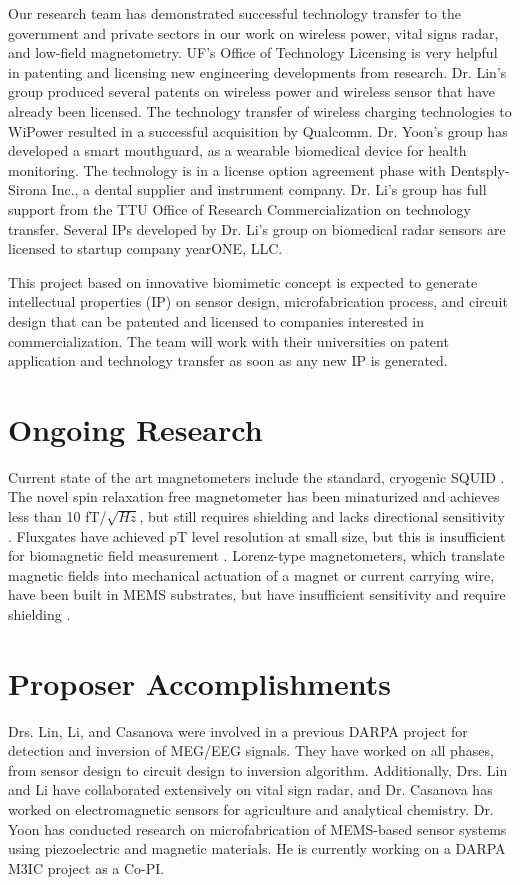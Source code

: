 Our research team has demonstrated successful technology transfer to the government and private sectors in our work on wireless power, vital signs radar, and low-field magnetometry. UF's Office of Technology Licensing is very helpful in patenting and licensing new engineering developments from research. Dr. Lin's group produced several patents on wireless power and wireless sensor that have already been licensed. The technology transfer of wireless charging technologies to WiPower resulted in a successful acquisition by Qualcomm. Dr. Yoon's group has developed a smart mouthguard, as a wearable biomedical device for health monitoring. The technology is in a license option agreement phase with Dentsply-Sirona Inc., a dental supplier and instrument company. Dr. Li's group has full support from the TTU Office of Research Commercialization on technology transfer. Several IPs developed by Dr. Li's group on biomedical radar sensors are licensed to startup company yearONE, LLC.

This project based on innovative biomimetic concept is expected to generate intellectual properties (IP) on sensor design, microfabrication process, and circuit design that can be patented and licensed to companies interested in commercialization. The team will work with their universities on patent application and technology transfer as soon as any new IP is generated. 

\section{Ongoing Research}
Current state of the art magnetometers include the standard, cryogenic SQUID \cite{lenz2006magnetic}. The novel spin relaxation free magnetometer has been minaturized and achieves less than 10 fT/$\sqrt{Hz}$, but still requires shielding and lacks directional sensitivity \cite{shah2013compact}. Fluxgates have achieved pT level resolution at small size, but this is insufficient for biomagnetic field measurement \cite{sasada2002orthogonal,uchiyama2014highly,sasada2014fundamental}. Lorenz-type magnetometers, which translate magnetic fields into mechanical actuation of a magnet or current carrying wire, have been built in MEMS substrates, but have insufficient sensitivity and require shielding \cite{sinha201627,kyynarainen20083d,kumar2015ultra,thompson2009parametrically}.

\section{Proposer Accomplishments}
Drs. Lin, Li, and Casanova were involved in a previous DARPA project for detection and inversion of MEG/EEG signals. They have worked on all phases, from sensor design to circuit design to inversion algorithm. Additionally, Drs. Lin and Li have collaborated extensively on vital sign radar, and Dr. Casanova has worked on electromagnetic sensors for agriculture and analytical chemistry. Dr. Yoon has conducted research on microfabrication of MEMS-based sensor systems using piezoelectric and magnetic materials. He is currently working on a DARPA M3IC project as a Co-PI.

